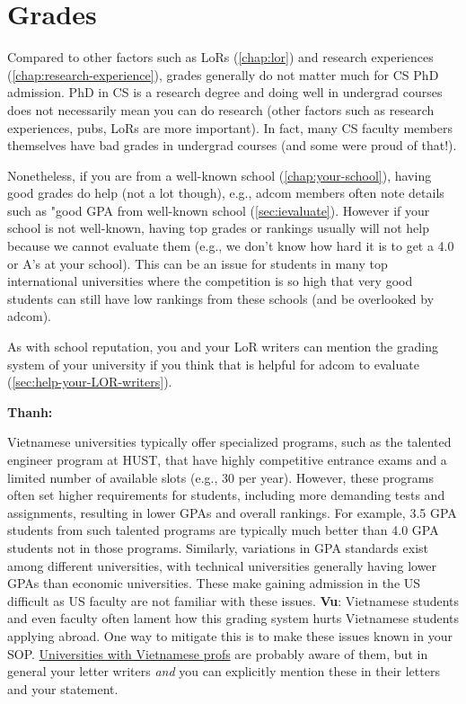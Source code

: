 \documentclass[oneside,11pt,dvipsnames]{book}
\newenvironment{commentbox}[1][]{
  \small
  \begin{mybox}
    {\small \textbf{#1}}
  }{
  \end{mybox}
}
\begin{document}
\section{Grades}\label{sec:gpa}

Compared to other factors such as LoRs (\autoref{chap:lor}) and research experiences (\autoref{chap:research-experience}), grades generally do not matter much for CS PhD admission. PhD in CS is a research degree and doing well in undergrad courses does not necessarily mean you can do research (other factors such as research experiences, pubs, LoRs are more important).  In fact, many CS faculty members themselves have bad grades in undergrad courses (and some were proud of that!).

Nonetheless, if you are from a well-known school (\autoref{chap:your-school}), having good grades do help (not a lot though), e.g., adcom members often note details such as "good GPA from well-known school (\autoref{sec:ievaluate}). However if your school is not well-known, having top grades or rankings usually will not help because we cannot evaluate them (e.g., we don't know how hard it is to get a 4.0 or A's at your school). This can be an issue for students in many top international universities where the competition is so high that very good students can still have low rankings from these schools (and be overlooked by adcom).

As with school reputation, you and your LoR writers can mention the grading system of your university if you think that is helpful for adcom to evaluate (\autoref{sec:help-your-LOR-writers}).


\begin{commentbox}[Thanh:]
    Vietnamese universities typically offer specialized programs, such as the talented engineer program at HUST, that have highly competitive entrance exams and a limited number of available slots (e.g., 30 per year). However, these programs often set higher requirements for students, including more demanding tests and assignments, resulting in lower GPAs and overall rankings. For example, 3.5 GPA students from such talented programs are typically much better than 4.0 GPA students not in those programs.  Similarly, variations in GPA standards exist among different universities, with technical universities generally having lower GPAs than economic universities. These make gaining admission in the US difficult as US faculty are not familiar with these issues.
    \tcblower
    \textbf{Vu}: Vietnamese students and even faculty often lament how this grading system hurts Vietnamese students applying abroad. One way to mitigate this is to make these issues known in your SOP.  \href{https://github.com/dynaroars/dynaroars.github.io/wiki/Viet-CS-Profs-US}{Universities with Vietnamese profs} are probably aware of them, but in general your letter writers \emph{and} you can explicitly mention these in their letters and your statement.
  \end{commentbox}
\end{document}
